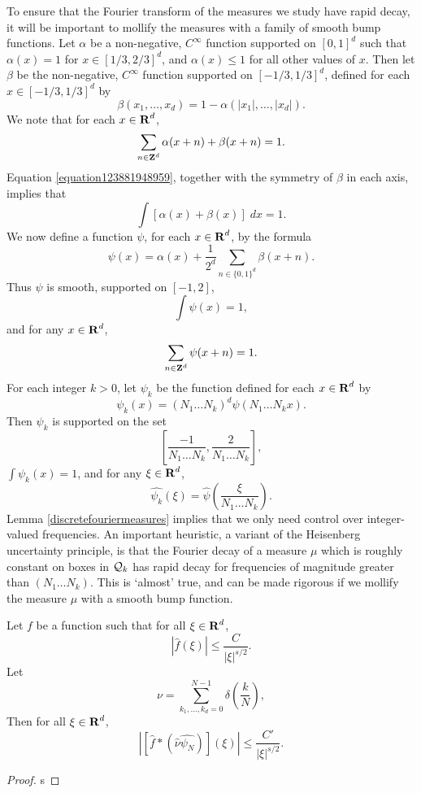 To ensure that the Fourier transform of the measures we study have rapid decay, it will be important to mollify the measures with a family of smooth bump functions. Let $\alpha$ be a non-negative, $C^\infty$ function supported on $[0,1]^d$ such that $\alpha(x) = 1$ for $x \in [1/3,2/3]^d$, and $\alpha(x) \leq 1$ for all other values of $x$. Then let $\beta$ be the non-negative, $C^\infty$ function supported on $[-1/3,1/3]^d$, defined for each $x \in [-1/3,1/3]^d$ by
%
\[ \beta(x_1, \dots, x_d) = 1 - \alpha(|x_1|, \dots, |x_d|). \]
%
We note that for each $x \in \operatorname{\mathbf{R}}^d$,
%
\begin{equation} \label{equation123881948959}
    \sum_{n \in \operatorname{\mathbf{Z}}^d} \alpha(x + n) + \beta(x + n) = 1.
\end{equation}
%
Equation \eqref{equation123881948959}, together with the symmetry of $\beta$ in each axis, implies that
%
\[ \int [\alpha(x) + \beta(x)]\; dx = 1. \]
%
We now define a function $\psi$, for each $x \in \operatorname{\mathbf{R}}^d$, by the formula
%
\[ \psi(x) = \alpha(x) + \frac{1}{2^d} \sum_{n \in \{0,1\}^d} \beta(x + n). \]
%
Thus $\psi$ is smooth, supported on $[-1,2]$,
%
\[ \int \psi(x) = 1, \]
%
and for any $x \in \operatorname{\mathbf{R}}^d$,
%
\[ \sum_{n \in \operatorname{\mathbf{Z}}^d} \psi(x + n) = 1. \]
%
For each integer $k > 0$, let $\psi_k$ be the function defined for each $x \in \operatorname{\mathbf{R}}^d$ by
%
\[ \psi_k(x) = (N_1 \dots N_k)^d \psi(N_1 \dots N_k x). \]
%
Then $\psi_k$ is supported on the set
%
\[ \left[ \frac{-1}{N_1 \dots N_k}, \frac{2}{N_1 \dots N_k} \right], \]
%
$\int \psi_k(x) = 1$, and for any $\xi \in \operatorname{\mathbf{R}}^d$,
%
\[ \widehat{\psi_k}(\xi) = \widehat{\psi} \left( \frac{\xi}{N_1 \dots N_k} \right). \]
%
Lemma \ref{discretefouriermeasures} implies that we only need control over integer-valued frequencies. An important heuristic, a variant of the Heisenberg uncertainty principle, is that the Fourier decay of a measure $\mu$ which is roughly constant on boxes in $\operatorname{\mathcal{Q}}_k$ has rapid decay for frequencies of magnitude greater than $(N_1 \dots N_k)$. This is `almost' true, and can be made rigorous if we mollify the measure $\mu$ with a smooth bump function.

\begin{lemma}
    Let $f$ be a function such that for all $\xi \in \operatorname{\mathbf{R}}^d$,
    \[ \left| \widehat{f}(\xi) \right| \leq \frac{C}{|\xi|^{s/2}}. \]
    Let
    \[ \nu = \sum_{k_1, \dots, k_d = 0}^{N - 1} \delta \left( \frac{k}{N} \right), \]
    Then for all $\xi \in \operatorname{\mathbf{R}}^d$,
    \[ \left| \left[ \widehat{f} * (\widehat{\nu} \widehat{\psi_N}) \right](\xi) \right| \leq \frac{C'}{|\xi|^{s/2}}. \]
\end{lemma}
\begin{proof}
    s
\end{proof}

